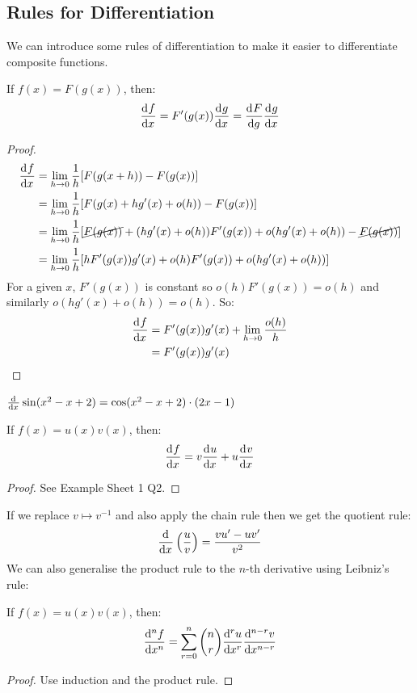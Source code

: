 \documentclass[../main.tex]{subfiles}
\begin{document}
\subsection{Rules for Differentiation}
We can introduce some rules of differentiation to make it easier to differentiate composite functions.
\begin{theorem}
 If $f(x) = F(g(x))$, then:
 \[
   \deriv{f}{x} = F'(g(x))\deriv{g}{x} = \deriv{F}{g} \deriv{g}{x}
 \]
\end{theorem}
\begin{proof}
  \begin{align*}
    \deriv{f}{x} &= \lim_{h \to 0} \frac{1}{h} [F(g(x + h)) - F(g(x))] \\
                 &= \lim_{h \to 0} \frac{1}{h} [F(g(x) + hg'(x) + o(h)) - F(g(x))] \\
                 &= \lim_{h \to 0} \frac{1}{h} [\cancel{F(g(x))} + (hg'(x) + o(h))F'(g(x)) + o(hg'(x) + o(h)) - \cancel{F(g(x))}] \\
                 &= \lim_{h \to 0} \frac{1}{h} [hF'(g(x))g'(x) + o(h)F'(g(x)) + o(hg'(x) + o(h))]
  \end{align*}
  For a given $x$, $F'(g(x))$ is constant so $o(h)F'(g(x)) = o(h)$ and similarly $o(hg'(x) + o(h)) = o(h)$. So:
  \begin{align*}
    \deriv{f}{x} &= F'(g(x))g'(x) + \lim_{h \to 0} \frac{o(h)}{h} \\
                 &= F'(g(x))g'(x)
  \end{align*}
\end{proof}
\begin{example}
  $\deriv{}{x} \sin(x^2 - x + 2) = \cos(x^2 - x + 2) \cdot (2x - 1)$
\end{example}
\begin{theorem}
  If $f(x) = u(x)v(x)$, then:
  \[
    \deriv{f}{x} = v \deriv{u}{x} + u \deriv{v}{x}
  \]
\end{theorem}
\begin{proof}
  See Example Sheet 1 Q2.
\end{proof}
If we replace $v \mapsto v^{-1}$ and also apply the chain rule then we get the quotient rule:
\[
  \deriv{}{x}\left(\frac{u}{v}\right) = \frac{vu' - uv'}{v^2}
\]
We can also generalise the product rule to the $n$-th derivative using Leibniz's rule:
\begin{theorem}
  If $f(x) = u(x)v(x)$, then:
  \[
    \deriv[n]{f}{x} = \sum_{r=0}^{n} \binom{n}{r}\deriv[r]{u}{x}\deriv[n-r]{v}{x}
  \]
\end{theorem}
\begin{proof}
  Use induction and the product rule.
\end{proof}
\end{document}

